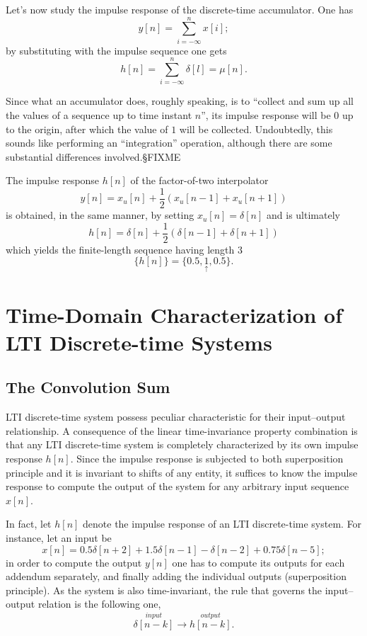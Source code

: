 \documentclass[\documentfontsize, twocolumn]{\classname}
\begin{document}
Let's now study the impulse response of the discrete-time accumulator. One has
\[
    y[n] = \sum_{i=-\infty}^{n} x[i];
\]
by substituting with the impulse sequence one gets
\[
    h[n] = \sum_{i=-\infty}^{n} \delta[l] = \mu[n].
\]

Since what an accumulator does, roughly speaking, is to ``collect and sum up all the values of a sequence up to time instant $n$'', its impulse response will be $0$ up to the origin, after which the value of $1$ will be collected. Undoubtedly, this sounds like performing an ``integration'' operation, although there are some substantial differences involved.§FIXME

The impulse response $h[n]$ of the factor-of-two interpolator
\[
    y[n] = x_u[n] + \frac 1 2(x_u[n-1] + x_u[n+1])
\]
is obtained, in the same manner, by setting $x_u[n]=\delta[n]$ and is ultimately
\[
    h[n] = \delta[n] + \frac 1 2(\delta[n-1] + \delta[n+1])
\]
which yields the finite-length sequence having length $3$
\[
    \{h[n]\} = \{0.5, \underset{\uparrow}{1}, 0.5\}.
\]

\section{Time-Domain Characterization of LTI Discrete-time Systems}

\subsection{The Convolution Sum}

LTI discrete-time system possess peculiar characteristic for their input--output relationship. A consequence of the linear time-invariance property combination is that any LTI discrete-time system is completely characterized by its own impulse response $h[n]$. Since the impulse response is subjected to both superposition principle and it is invariant to shifts of any entity, it suffices to know the impulse response to compute the output of the system for any arbitrary input sequence $x[n]$.

In fact, let $h[n]$ denote the impulse response of an LTI discrete-time system. For instance, let an input be
\[
    x[n] = 0.5\delta[n+2] + 1.5\delta[n-1] - \delta[n-2] + 0.75\delta[n-5];
\]
in order to compute the output $y[n]$ one has to compute its outputs for each addendum separately, and finally adding the individual outputs (superposition principle). As the system is also time-invariant, the rule that governs the input--output relation is the following one,
\begin{equation}\label{eqn:impulseResponseLTI}
    \overset{input}{\delta[n-k]} \longrightarrow \overset{output}{h[n-k]}.
\end{equation}
\end{document}
